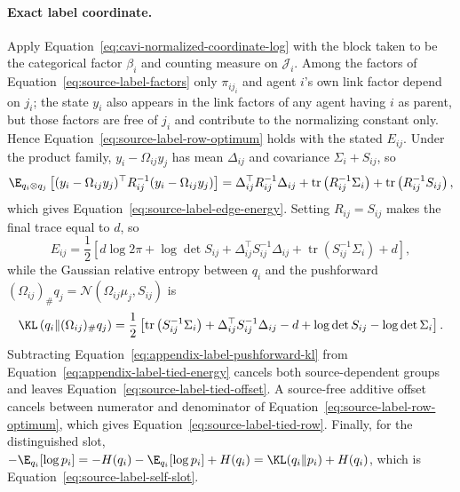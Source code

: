 \paragraph{Exact label coordinate.}
Apply Equation~\eqref{eq:cavi-normalized-coordinate-log} with the block taken to be the categorical factor \(\beta_i\) and counting measure on \(\mathcal J_i\). Among the factors of Equation~\eqref{eq:source-label-factors} only \(\pi_{ij_i}\) and agent \(i\)'s own link factor depend on \(j_i\); the state \(y_i\) also appears in the link factors of any agent having \(i\) as parent, but those factors are free of \(j_i\) and contribute to the normalizing constant only. Hence Equation~\eqref{eq:source-label-row-optimum} holds with the stated \(E_{ij}\). Under the product family, \(y_i-\Omega_{ij}y_j\) has mean \(\Delta_{ij}\) and covariance \(\Sigma_i+S_{ij}\), so
\begin{equation}
\E_{q_i\otimes q_j}\left[(y_i-\Omega_{ij}y_j)^\top R_{ij}^{-1}(y_i-\Omega_{ij}y_j)\right]
=\Delta_{ij}^\top R_{ij}^{-1}\Delta_{ij}
+\operatorname{tr}\left(R_{ij}^{-1}\Sigma_i\right)
+\operatorname{tr}\left(R_{ij}^{-1}S_{ij}\right),
\label{eq:appendix-label-quadratic-expectation}
\end{equation}
which gives Equation~\eqref{eq:source-label-edge-energy}. Setting \(R_{ij}=S_{ij}\) makes the final trace equal to \(d\), so
\begin{equation}
E_{ij}
=\frac12\left[
d\log 2\pi+\log\det S_{ij}
+\Delta_{ij}^\top S_{ij}^{-1}\Delta_{ij}
+\operatorname{tr}\left(S_{ij}^{-1}\Sigma_i\right)+d
\right],
\label{eq:appendix-label-tied-energy}
\end{equation}
while the Gaussian relative entropy between \(q_i\) and the pushforward \((\Omega_{ij})_{\#}q_j=\mathcal N(\Omega_{ij}\mu_j,S_{ij})\) is
\begin{equation}
\KL\left(q_i\middle\Vert(\Omega_{ij})_{\#}q_j\right)
=\frac12\left[
\operatorname{tr}\left(S_{ij}^{-1}\Sigma_i\right)
+\Delta_{ij}^\top S_{ij}^{-1}\Delta_{ij}-d
+\log\det S_{ij}-\log\det\Sigma_i
\right].
\label{eq:appendix-label-pushforward-kl}
\end{equation}
Subtracting Equation~\eqref{eq:appendix-label-pushforward-kl} from Equation~\eqref{eq:appendix-label-tied-energy} cancels both source-dependent groups and leaves Equation~\eqref{eq:source-label-tied-offset}. A source-free additive offset cancels between numerator and denominator of Equation~\eqref{eq:source-label-row-optimum}, which gives Equation~\eqref{eq:source-label-tied-row}. Finally, for the distinguished slot, \(-\E_{q_i}[\log p_i]=-H(q_i)-\E_{q_i}[\log p_i]+H(q_i)=\KL(q_i\Vert p_i)+H(q_i)\), which is Equation~\eqref{eq:source-label-self-slot}.

